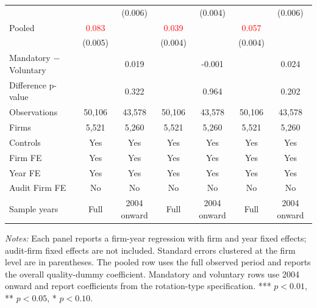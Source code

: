 \begin{table}[htbp]
\begin{threeparttable}
{\begin{tabular}{l cc cc cc}
 &  & (0.006) &  & (0.004) &  & (0.006) \\
Pooled & \textcolor{red}{0.083\sym{***}} &  & \textcolor{red}{0.039\sym{***}} &  & \textcolor{red}{0.057\sym{***}} &  \\
 & (0.005) &  & (0.004) &  & (0.004) &  \\
Mandatory $-$ Voluntary &  & 0.019 &  & -0.001 &  & 0.024 \\
Difference p-value &  & 0.322 &  & 0.964 &  & 0.202 \\
Observations & 50,106 & 43,578 & 50,106 & 43,578 & 50,106 & 43,578 \\
Firms & 5,521 & 5,260 & 5,521 & 5,260 & 5,521 & 5,260 \\
\midrule
Controls & Yes & Yes & Yes & Yes & Yes & Yes \\
Firm FE & Yes & Yes & Yes & Yes & Yes & Yes \\
Year FE & Yes & Yes & Yes & Yes & Yes & Yes \\
Audit Firm FE & No & No & No & No & No & No \\
Sample years & Full & 2004 onward & Full & 2004 onward & Full & 2004 onward \\
\bottomrule
\end{tabular}}
\begin{tablenotes}\footnotesize
\item \textit{Notes:} Each panel reports a firm-year regression with firm and year fixed effects; audit-firm fixed effects are not included. Standard errors clustered at the firm level are in parentheses. The pooled row uses the full observed period and reports the overall quality-dummy coefficient. Mandatory and voluntary rows use 2004 onward and report coefficients from the rotation-type specification. *** \(p<0.01\), ** \(p<0.05\), * \(p<0.10\).
\end{tablenotes}
\end{threeparttable}
\end{table}
